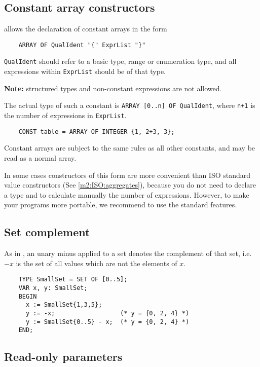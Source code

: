 \subsection{Constant array constructors}\label{m2:constarrays}
\mextonly

\xds{} allows the declaration of constant arrays in the form

\verb'    ARRAY OF QualIdent "{" ExprList "}"'

{\tt QualIdent} should refer to a basic type, range or enumeration  type,  and
all expressions within {\tt ExprList} should be of that type.

{\bf Note:} structured types and non-constant expressions
are not allowed.

The actual type of such a constant is \verb|ARRAY [0..n] OF QualIdent|,
where \verb|n+1| is the number
of expressions in \verb'ExprList'.

\verb'    CONST table = ARRAY OF INTEGER {1, 2+3, 3};'

Constant arrays are subject to the same rules as all other constants,
and may be read as a normal array.

In some cases constructors of this form are more convenient than
ISO standard value constructors (See \ref{m2:ISO:aggregates}),
because you do not need to declare a type and to calculate
manually the number of expressions. However, to make your
programs more portable, we recommend to use the standard features.

\subsection{Set complement}

\mextonly

As in \ot{}, an unary minus applied to a set denotes the complement
of that set, i.e. $-x$ is the set of all values which are not the elements
of $x$.

\begin{verbatim}
    TYPE SmallSet = SET OF [0..5];
    VAR x, y: SmallSet;
    BEGIN
      x := SmallSet{1,3,5};
      y := -x;                  (* y = {0, 2, 4} *)
      y := SmallSet{0..5} - x;  (* y = {0, 2, 4} *)
    END;
\end{verbatim}

\subsection{Read-only parameters}\label{m2:ext:RO_param}

